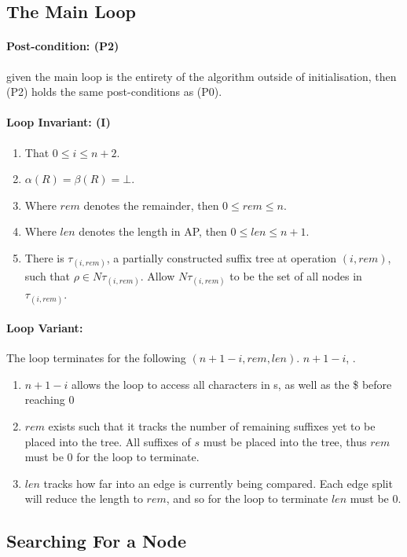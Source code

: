 \documentclass{article}
\begin{document}
	\subsection{The Main Loop}
	\paragraph{Post-condition: (P2)} given the main loop is the entirety of the algorithm outside of initialisation, then (P2) holds the same post-conditions as (P0).
	
	\paragraph{Loop Invariant: (I)}
	\begin{enumerate}[label=(I.\arabic*)]
		\item That $0 \le i \le n + 2$.
		\item $\alpha(R) = \beta(R) = \bot$.
		\item Where $rem$ denotes the remainder, then $0 \le rem \le n$.
		\item Where $len$ denotes the length in AP, then $0 \le len \le n + 1$.
		\item There is $\tau_{(i, rem)}$, a partially constructed suffix tree at operation $(i, rem)$, such that $\rho \in N\tau_{(i, rem)}$.  Allow $N\tau_{(i, rem)}$ to be the set of all nodes in $\tau_{(i, rem)}$.
	\end{enumerate}
	
	\paragraph{Loop Variant:} The loop terminates for the following $(n + 1 - i, rem, len)$.  $n + 1 - i$, .  
	\begin{enumerate}
		\item $n + 1 - i$ allows the loop to access all characters in s, as well as the \$ before reaching $0$
		\item $rem$ exists such that it tracks the number of remaining suffixes yet to be placed into the tree.  All suffixes of $s$ must be placed into the tree, thus $rem$ must be $0$ for the loop to terminate.
		\item $len$ tracks how far into an edge is currently being compared.  Each edge split will reduce the length to $rem$, and so for the loop to terminate $len$ must be $0$.
	\end{enumerate}
	
	\subsection{Searching For a  Node}
\end{document}
